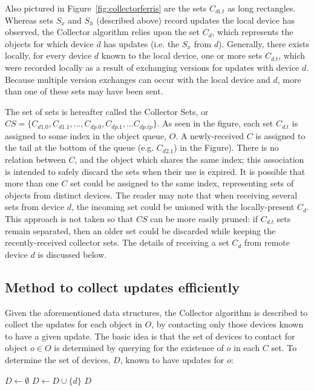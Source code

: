 Also pictured in Figure~\ref{fig:collectorferris} are the sets $C_{di.t}$ as long
rectangles. Whereas sets $S_x$ and $S_h$ (described above) record updates the
local device has observed, the Collector algorithm relies upon the set $C_d$,
which represents the objects for which device $d$ has updates (i.e. the $S_x$
from $d$). Generally, there exists locally, for every device $d$ known to the
local device, one or more sets $C_{d.t}$, which were recorded locally as a
result of exchanging versions for updates with device $d$. Because multiple
version exchanges can occur with the local device and $d$, more than one of
these sets may have been sent.

The set of sets is hereafter called the Collector Sets, or $CS=\{C_{d1.0},
C_{d1.1}, \ldots, C_{dp.0}, C_{dp.1}, \ldots C_{dp.tp}\}$. As seen in the
figure, each set $C_{d.t}$ is assigned to some index in the object queue, $O$. A
newly-received $C$ is assigned to the tail at the bottom of the queue (e.g.
$C_{d2.1}$) in the Figure). There is no relation between $C$, and the object
which shares the same index; this association is intended to safely discard the
sets when their use is expired. It is possible that more than one $C$ set could
be assigned to the same index, representing sets of objects from distinct
devices. The reader may note that when receiving several sets from device $d$,
the incoming set could be unioned with the locally-present $C_d$. This approach
is not taken so that $CS$ can be more easily pruned: if $C_{d.t}$ sets remain
separated, then an older set could be discarded while keeping the
recently-received collector sets. The details of receiving a set $C_d$ from
remote device $d$ is discussed below.

\subsection*{Method to collect updates efficiently}

Given the aforementioned data structures, the Collector algorithm is described
to collect the updates for each object in $O$, by contacting only those devices
known to have a given update. The basic idea is that the set of devices to
contact for object $o \in O$ is determined by querying for the existence of $o$
in each $C$ set. To determine the set of devices, $D$, known to have updates for
$o$:
\begin{algorithmic}
\State $D \gets \emptyset$
    \State $D \gets D \cup \{d\}$
  \EndIf
\EndFor
\State \Return $D$
\EndFunction
\end{algorithmic}

